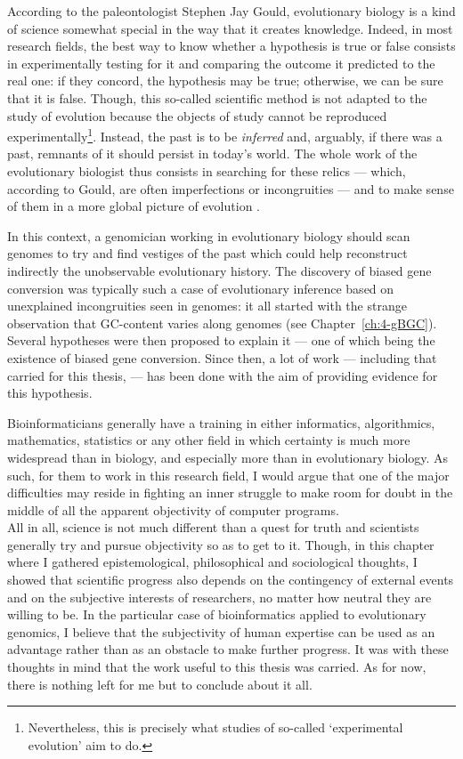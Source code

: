 According to the paleontologist Stephen Jay Gould, evolutionary biology is a kind of science somewhat special in the way that it creates knowledge.
Indeed, in most research fields, the best way to know whether a hypothesis is true or false consists in experimentally testing for it and comparing the outcome it predicted to the real one: if they concord, the hypothesis may be true; otherwise, we can be sure that it is false.
Though, this so-called scientific method is not adapted to the study of evolution because the objects of study cannot be reproduced experimentally\footnote{Nevertheless, this is precisely what studies of so-called ‘experimental evolution’ aim to do.}.
Instead, the past is to be \textit{inferred} and, arguably, if there was a past, remnants of it should persist in today's world.
The whole work of the evolutionary biologist thus consists in searching for these relics — which, according to Gould, are often imperfections or incongruities — and to make sense of them in a more global picture of evolution \citep{gould1979turtles}.

In this context, a genomician working in evolutionary biology should scan genomes to try and find vestiges of the past which could help reconstruct indirectly the unobservable evolutionary history.
The discovery of biased gene conversion was typically such a case of evolutionary inference based on unexplained incongruities seen in genomes:
it all started with the strange observation that GC-content varies along genomes (see Chapter~\ref{ch:4-gBGC}).
Several hypotheses were then proposed to explain it — one of which being the existence of biased gene conversion.
Since then, a lot of work — including that carried for this thesis, — has been done with the aim of providing evidence for this hypothesis.

Bioinformaticians generally have a training in either informatics, algorithmics, mathematics, statistics or any other field in which certainty is much more widespread than in biology, and especially more than in evolutionary biology.
As such, for them to work in this research field, I would argue that one of the major difficulties may reside in fighting an inner struggle to make room for doubt in the middle of all the apparent objectivity of computer programs.\\







All in all, science is not much different than a quest for truth and scientists generally try and pursue objectivity so as to get to it.
Though, in this chapter where I gathered epistemological, philosophical and sociological thoughts, I showed that scientific progress also depends on the contingency of external events and on the subjective interests of researchers, no matter how neutral they are willing to be.
In the particular case of bioinformatics applied to evolutionary genomics, I believe that the subjectivity of human expertise can be used as an advantage rather than as an obstacle to make further progress.
It was with these thoughts in mind that the work useful to this thesis was carried.
As for now, there is nothing left for me but to conclude about it all.




